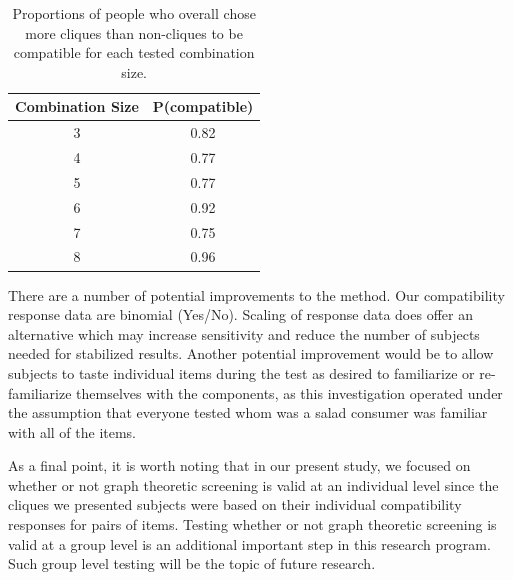 \begin{table}[h!b!p!]
\caption[Proportions of people whom preferred cliques over non-cliques to be compatible.]{Proportions of people who overall chose more cliques than non-cliques to be compatible for each tested combination size.}
\centering
\begin{tabular}{cc}
\toprule
{\bf Combination Size} & {\bf P(compatible)} \\
\midrule
3 & 0.82 \\
4 & 0.77  \\
5 & 0.77 \\
6 & 0.92 \\
7 & 0.75 \\
8 & 0.96  \\
\bottomrule
\end{tabular}
\label{tab:propsalad}
\end{table}

There are a number of potential improvements to the method.  Our compatibility response data are binomial (Yes/No).  Scaling of response data does offer an alternative which may increase sensitivity and reduce the number of subjects needed for stabilized results.  Another potential improvement would be to allow subjects to taste individual items during the test as desired to familiarize or re-familiarize themselves with the components, as this investigation operated under the assumption that everyone tested whom was a salad consumer was familiar with all of the items.

As a final point, it is worth noting that in our present study, we focused on whether or not graph theoretic screening is valid at an individual level since the cliques we presented subjects were based on their individual compatibility responses for pairs of items.  Testing whether or not graph theoretic screening is valid at a group level is an additional important step in this research program.  Such group level testing will be the topic of future research.    

\pagebreak
\renewcommand\bibname{{REFERENCES}} %
{} %

